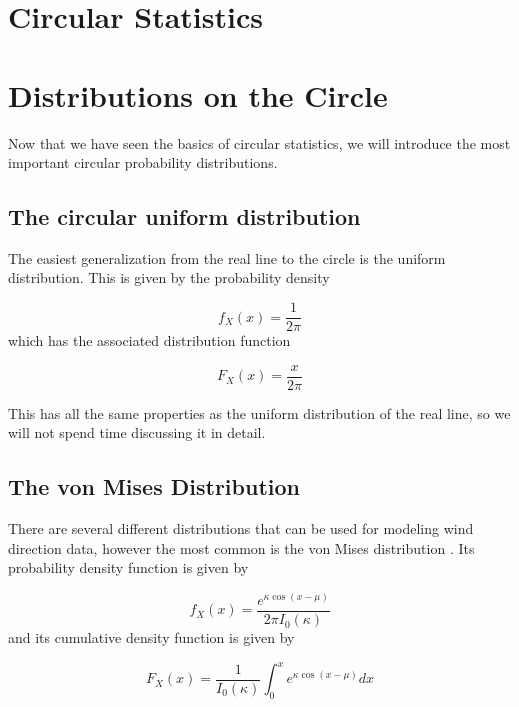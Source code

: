 \documentclass[11pt]{article}
\numberwithin{equation}{section}
\numberwithin{figure}{section}
\begin{document}
\section{Circular Statistics}

\section{Distributions on the Circle}

Now that we have seen the basics of circular statistics, we will introduce the most important circular probability distributions. 

\subsection{The circular uniform distribution}

The easiest generalization from the real line to the circle is the uniform distribution. This is given by the probability density

\begin{equation}\label{uniformpdf}
f_X(x) = \frac{1}{2\pi} 
\end{equation}
which has the associated distribution function 

\begin{equation}\label{uniformcdf}
F_X(x) = \frac{x}{2\pi}
\end{equation}

This has all the same properties as the uniform distribution of the real line, so we will not spend time discussing it in detail. 

\subsection{The von Mises Distribution}
There are several different distributions that can be used for modeling wind direction data, however the most common is the von Mises distribution \cite{Al Yammahi}. Its probability density function is given by

\begin{equation}\label{eq:vm}
f_{X}(x) = \frac{e^{\kappa \cos(x - \mu)}}{2\pi I_0(\kappa)}
\end{equation}
and its cumulative density function is given by \cite{Kanti}

\begin{equation}\label{eq:vmcdf}
F_X(x) = \frac{1}{I_0(\kappa)}\int_0^x e^{\kappa \cos(x-\mu)}dx
\end{equation}
\end{document}
